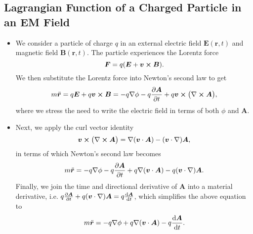 \documentclass[11pt, a4paper]{article}
\renewcommand{\vec}[1]{\bm{#1}} %
\renewcommand{\r}{\vec{r}}
\newcommand{\E}{\vec{E}} %
\newcommand{\B}{\vec{B}} %
\newcommand{\A}{\vec{A}} %
\renewcommand{\curl}{\nabla \cross}
\renewcommand{\grad}{\nabla}
\begin{document}
\subsection{Lagrangian Function of a Charged Particle in an EM Field}
\begin{itemize}
    \item We consider a particle of charge $ q $ in an external electric field $ \E(\r, t) $ and magnetic field $ \B(\r, t) $. The particle experiences the Lorentz force
    \begin{equation*}
        \vec{F} = q(\E + \vec{v}\cross \B).
    \end{equation*}
    We then substitute the Lorentz force into Newton's second law to get
    \begin{equation*}
        m \ddot{\vec{r}} = q\E + q \vec{v} \cross \B = - q\grad \phi - q \pdv{\A}{t} + q \vec{v}\cross \big( \curl \A \big),
    \end{equation*}
    where we stress the need to write the electric field in terms of both $ \phi $ and $ \A $. 

    \item Next, we apply the curl vector identity
    \begin{equation*}
        \vec{v}\cross \big( \curl \A \big) = \grad ( \vec{v}\cdot \A) - ( \vec{v}\cdot \grad)\A,
    \end{equation*}
    in terms of which Newton's second law becomes
    \begin{equation*}
        m \ddot{\vec{r}} = - q \grad \phi - q \pdv{\A}{t} + q \grad ( \vec{v}\cdot \A) - q( \vec{v} \cdot \grad)\A.
    \end{equation*}
    Finally, we join the time and directional derivative of $ \A $ into a material derivative, i.e. $ q \pdv{\A}{t} + q(\vec{v}\cdot \grad)\A = q \dv{\A}{t}$, which simplifies the above equation to
    \begin{equation*}
        m \ddot{\vec{r}} = -q \grad \phi + q \grad ( \vec{v} \cdot \A) - q \dv{\A}{t}.
    \end{equation*}
    

\end{itemize}
\end{document}
